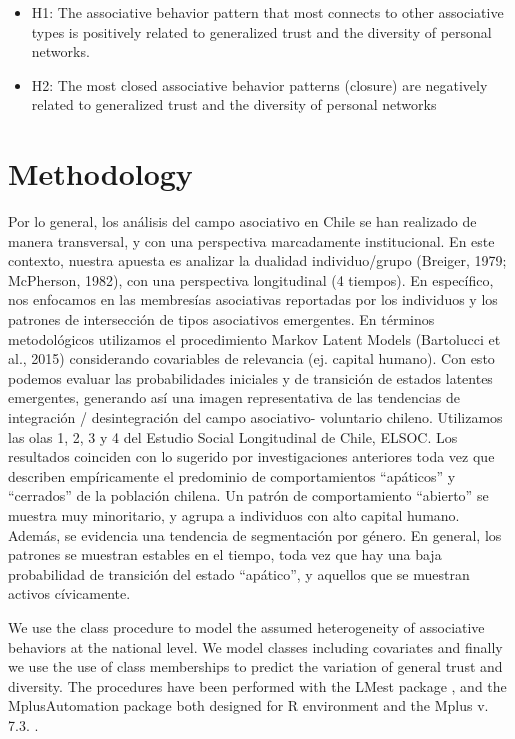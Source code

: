 \begin{itemize}
  \item H1: The associative behavior pattern that most connects to other associative types is positively related to generalized trust and the diversity of personal networks. 
  \item H2: The most closed associative behavior patterns (closure) are negatively related to generalized trust and the diversity of personal networks 
\end{itemize}





\section{Methodology}

Por lo general, los análisis del campo asociativo en Chile se han realizado de manera transversal, y con una perspectiva marcadamente institucional. En este contexto, nuestra apuesta es analizar la dualidad individuo/grupo (Breiger, 1979; McPherson, 1982), con una perspectiva longitudinal (4 tiempos). En específico, nos enfocamos en las membresías asociativas reportadas por los individuos y los patrones de  intersección de tipos asociativos emergentes. En términos metodológicos utilizamos el procedimiento Markov Latent Models (Bartolucci et al., 2015) considerando covariables de relevancia (ej. capital humano). Con esto podemos evaluar las probabilidades iniciales y de transición de estados latentes emergentes, generando así una imagen representativa de las tendencias de integración / desintegración del campo asociativo- voluntario chileno. Utilizamos las olas 1, 2, 3 y 4 del Estudio Social Longitudinal de Chile, ELSOC. Los resultados coinciden con lo sugerido por investigaciones anteriores toda vez que describen empíricamente el predominio de comportamientos “apáticos” y “cerrados” de la población chilena. Un patrón de comportamiento “abierto” se muestra muy minoritario, y agrupa a individuos con alto capital humano. Además, se evidencia una tendencia de segmentación por género. En general, los patrones se muestran estables en el tiempo, toda vez que hay una baja probabilidad de transición del estado “apático”, y aquellos que se muestran activos cívicamente.
\bigskip

We use the class procedure to model the assumed heterogeneity of associative behaviors at the national level. We model classes including covariates and finally we use the use of class memberships to predict the variation of general trust and diversity. The procedures have been performed with the LMest package \parencite{bartolucci_lmest_2020,bartolucci_latent_2015}, and the MplusAutomation package \parencite{hallquist_mplusautomation_2020} both designed for R environment and the Mplus v. 7.3. \parencite{muthen_mplus_2009}.

